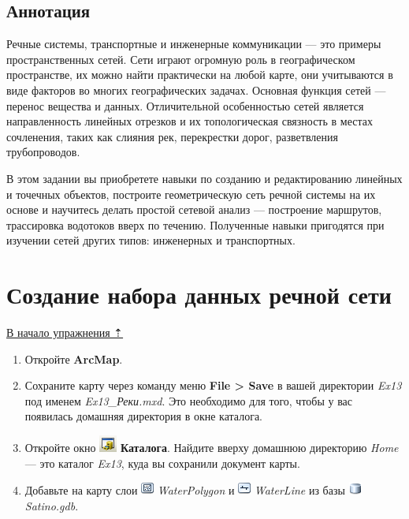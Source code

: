 \documentclass[12pt,]{book}
\begin{document}
\hypertarget{network-hydro-annotation}{%
\subsection{Аннотация}\label{network-hydro-annotation}}

Речные системы, транспортные и инженерные коммуникации --- это примеры пространственных сетей. Сети играют огромную роль в географическом пространстве, их можно найти практически на любой карте, они учитываются в виде факторов во многих географических задачах. Основная функция сетей --- перенос вещества и данных. Отличительной особенностью сетей является направленность линейных отрезков и их топологическая связность в местах сочленения, таких как слияния рек, перекрестки дорог, разветвления трубопроводов.

В этом задании вы приобретете навыки по созданию и редактированию линейных и точечных объектов, построите геометрическую сеть речной системы на их основе и научитесь делать простой сетевой анализ --- построение маршрутов, трассировка водотоков вверх по течению. Полученные навыки пригодятся при изучении сетей других типов: инженерных и транспортных.

\hypertarget{network-hydro-dataset}{%
\section{Создание набора данных речной сети}\label{network-hydro-dataset}}

\protect\hyperlink{network-hydro}{В начало упражнения ⇡}

\begin{enumerate}
\def\labelenumi{\arabic{enumi}.}
\item
  Откройте \textbf{ArcMap}.
\item
  Сохраните карту через команду меню \textbf{File \textgreater{} Save} в вашей директории \emph{Ex13} под именем \emph{Ex13\_Реки.mxd}. Это необходимо для того, чтобы у вас появилась домашняя директория в окне каталога.
\item
  Откройте окно \includegraphics{images/Ex13/image2.png} \textbf{Каталога}. Найдите вверху домашнюю директорию \emph{Home} --- это каталог \emph{Ex13}, куда вы сохранили документ карты.
\item
  Добавьте на карту слои \includegraphics{images/Ex13/image3.png} \emph{WaterPolygon} и \includegraphics{images/Ex13/image4.png} \emph{WaterLine} из базы \includegraphics{images/Ex13/image5.png} \emph{Satino.gdb}.
\end{enumerate}
\end{document}
